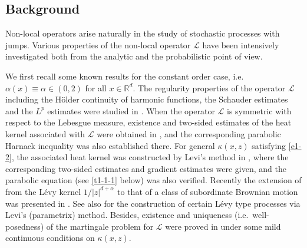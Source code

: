 \documentclass[a4paper,11pt]{amsart}
\newcommand{\R}{\mathds R}
\newcommand{\K}{\kappa}
\newcommand{\A}{\alpha}
\def\LL{{\mathcal L}}
\theoremstyle{definition}
\begin{document}
\subsection{Background}
Non-local operators  arise naturally in the study of stochastic processes with jumps. Various properties of the non-local operator $\LL$ have been intensively investigated both from the analytic and the probabilistic point of view.

We first recall some known results for the constant order case,
i.e.\ $\A(x) \equiv \A \in (0,2)$ for all $x\in\R^d$. The regularity
properties of the operator $\LL$ including the H\"{o}lder continuity
of harmonic functions, the Schauder estimates and the $L^p$
estimates were studied in \cite{Bass2,CS1,CS,CV,CRZ,S1,S2,Z}. When
the operator $\LL$ is symmetric with respect to the Lebesgue measure,
existence and two-sided estimates of the heat kernel associated with $\LL$
were obtained in \cite{CK,CK1}, and
the corresponding parabolic Harnack inequality was also established
there. For general $\K(x,z)$ satisfying \eqref{e1-2}, the associated
heat kernel was constructed by Levi's method in \cite{CZ}, where the
corresponding two-sided estimates and gradient estimates were given,
and the parabolic equation (see \eqref{t1-1-1} below) was also
verified. Recently the extension of \cite{CZ}
from the L\'evy kernel $1/|z|^{d+\alpha}$ to that of a  class of subordinate Brownian motion
was presented in  \cite{KSV}. See also
\cite{BSK, GS, Kim, KK1,KK2, Ku, KR17,Kul, SZ} for the construction of certain L\'evy
type processes via Levi's  (parametrix)
 method. Besides, existence and uniqueness
(i.e.\ well-posedness) of the martingale problem for $\LL$ were proved
in \cite{BT, CZ4, J} under some mild continuous conditions on $\K(x,z)$.
\end{document}
